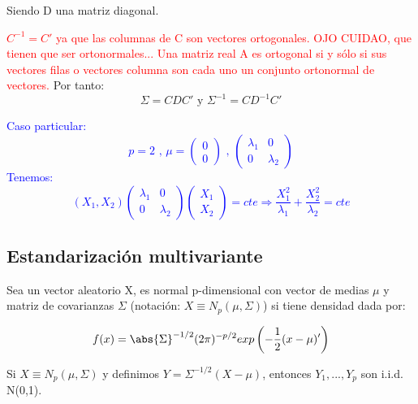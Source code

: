 \documentclass[nochap]{apuntes}
\begin{document}
Siendo D una matriz diagonal.

\textcolor{red}{$C^{-1}=C'$ ya que las columnas de C son vectores ortogonales. OJO CUIDAO, que tienen que ser ortonormales...
Una matriz real A es ortogonal si y sólo si sus vectores filas o vectores columna son cada uno un conjunto ortonormal de vectores.}
Por tanto:
\[
\Sigma = CDC'  \text{ y } \Sigma^{-1} = CD^{-1}C'
\]

\textcolor{blue}{Caso particular:
\[
p=2 \text{ , } 
\mu=\left(
\begin{array}{c}
0\\
0
\end{array}
\right)
\text{ , }
\left(
\begin{array}{cc}
\lambda_1& 0 \\
0 & \lambda_2
\end{array}
\right)
\]
Tenemos:
\[
(X_1, X_2)
\left(
\begin{array}{cc}
\lambda_1& 0 \\
0 & \lambda_2
\end{array}
\right)
\left(
\begin{array}{c}
X_1\\
X_2
\end{array}
\right) = cte
\Rightarrow
\frac{X_1^2}{\lambda_1}+\frac{X_2^2}{\lambda_2}=cte
\]
}


\subsection{Estandarización multivariante}
\begin{defn}
Sea un vector aleatorio X, es normal p-dimensional con vector de medias $\mu$ y matriz de covarianzas $\Sigma$ (notación: $X\equiv N_p(\mu, \Sigma)$) si tiene densidad dada por:

\[
f(x)=\abs{\Sigma}^{-1/2}(2\pi)^{-p/2} exp \left( -\frac{1}{2}(x-\mu)' \right) 
\]
\end{defn}

\prop Si $X \equiv N_p(\mu, \Sigma)$ y definimos $Y = \Sigma^{-1/2}(X-\mu)$, entonces $Y_1,...,Y_p$ son i.i.d. N(0,1).
\end{document}
